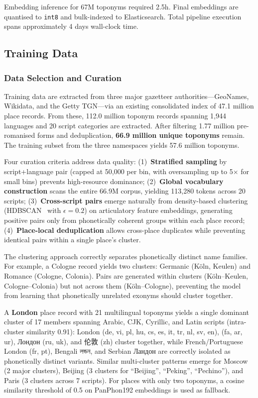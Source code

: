 \documentclass[11pt,a4paper]{article}
\newcommand{\textar}[1]{{\arabicfont\RL{#1}}}
\newcommand{\textbn}[1]{{\bengalifont #1}}
\newcommand{\textcn}[1]{{\chinesefont #1}}
\begin{document}
Embedding inference for 67M toponyms required 2.5h. Final embeddings are quantised to \texttt{int8} and bulk-indexed to Elasticsearch. Total pipeline execution spans approximately 4 days wall-clock time.


\subsection{Training Data}
\label{subsec:data}

\subsubsection{Data Selection and Curation}
\label{subsec:selection}

Training data are extracted from three major gazetteer authorities---GeoNames, Wikidata, and the Getty TGN---via an existing consolidated index of 47.1 million place records. From these, 112.0 million toponym records spanning 1,944 languages and 20 script categories are extracted. After filtering 1.77 million pre-romanised forms and deduplication, \textbf{66.9 million unique toponyms} remain. The training subset from the three namespaces yields 57.6 million toponyms.

Four curation criteria address data quality: (1)~\textbf{Stratified sampling} by script+language pair (capped at 50,000 per bin, with oversampling up to 5$\times$ for small bins) prevents high-resource dominance; (2)~\textbf{Global vocabulary construction} scans the entire 66.9M corpus, yielding 113,280 tokens across 20 scripts; (3)~\textbf{Cross-script pairs} emerge naturally from density-based clustering (HDBSCAN~\citep{mcinnes2017hdbscan} with $\epsilon = 0.2$) on articulatory feature embeddings, generating positive pairs only from phonetically coherent groups within each place record; (4)~\textbf{Place-local deduplication} allows cross-place duplicates while preventing identical pairs within a single place's cluster.

The clustering approach correctly separates phonetically distinct name families. For example, a Cologne record yields two clusters: Germanic (Köln, Keulen) and Romance (Cologne, Colonia). Pairs are generated within clusters (Köln--Keulen, Cologne--Colonia) but not across them (Köln--Cologne), preventing the model from learning that phonetically unrelated exonyms should cluster together.

A \textbf{London} place record with 21 multilingual toponyms yields a single dominant cluster of 17 members spanning Arabic, CJK, Cyrillic, and Latin scripts (intra-cluster similarity 0.91): London (de, vi, pl, hu, cs, es, it, tr, nl, sv, en), \textar{لندن} (fa, ar, ur), Лондон (ru, uk), and \textcn{伦敦} (zh) cluster together, while French/Portuguese London (fr, pt), Bengali \textbn{লন্ডন}, and Serbian Ландон are correctly isolated as phonetically distinct variants. Similar multi-cluster patterns emerge for Moscow (2 major clusters), Beijing (3 clusters for ``Beijing'', ``Peking'', ``Pechino''), and Paris (3 clusters across 7 scripts). For places with only two toponyms, a cosine similarity threshold of 0.5 on PanPhon192 embeddings is used as fallback.
\end{document}
